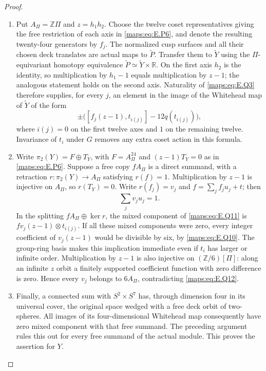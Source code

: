 \begin{proof}
\begin{enumerate}[label=\arabic*.,leftmargin=*]
\item Put $A_\Pi=\mathbb Z\Pi$ and $z=h_1h_2$.  Choose the twelve
coset representatives giving the free restriction of each
axis in \eqref{maps:eq:E.P6}, and denote the resulting twenty-four generators
by $f_j$.  The normalized cusp surfaces and all their chosen
deck translates are actual maps to $\widetilde P$.  Transfer
them to $\widetilde Y$ using the $\Pi$-equivariant homotopy
equivalence $\widetilde P\simeq\widetilde Y\times\mathbb R$.
On the first axis $h_2$ is the identity, so multiplication
by $h_1-1$ equals multiplication by $z-1$; the analogous
statement holds on the second axis.  Naturality of \eqref{maps:eq:E.Q3}
therefore supplies, for every $j$, an element in the image
of the Whitehead map of $\widetilde Y$ of the form
\[
 \pm\bigl([f_j(z-1),t_{i(j)}]-12q(t_{i(j)})\bigr),
 \tag{E.Q11}\label{maps:eq:E.Q11}
\]
where $i(j)=0$ on the first twelve axes and $1$ on the
remaining twelve.  Invariance of $t_i$ under $G$ removes
any extra coset action in this formula.

\item Write $\pi_2(Y)=F\oplus T_Y$, with $F=A_\Pi^{24}$ and
$(z-1)T_Y=0$ as in \eqref{maps:eq:E.P6}.  Suppose a free copy $fA_\Pi$
is a direct summand, with a retraction $r:\pi_2(Y)\to A_\Pi$
satisfying $r(f)=1$.  Multiplication by $z-1$ is injective
on $A_\Pi$, so $r(T_Y)=0$.  Write $r(f_j)=v_j$ and
$f=\sum_j f_j u_j+t$; then
\[
                         \sum_j v_j u_j=1.
 \tag{E.Q12}\label{maps:eq:E.Q12}
\]
In the splitting $fA_\Pi\oplus\ker r$, the mixed component
of \eqref{maps:eq:E.Q11} is $f v_j(z-1)\otimes t_{i(j)}$.  If all these
mixed components were zero, every integer coefficient of
$v_j(z-1)$ would be divisible by six, by \eqref{maps:eq:E.Q10}.  The
group-ring basis makes this implication immediate even if
$t_i$ has larger or infinite order.  Multiplication by
$z-1$ is also injective on $(\mathbb Z/6)[\Pi]$: along an
infinite $z$ orbit a finitely supported coefficient function
with zero difference is zero.  Hence every $v_j$ belongs
to $6A_\Pi$, contradicting \eqref{maps:eq:E.Q12}.

\item Finally, a connected sum with $S^2\times S^7$ has, through
dimension four in its universal cover, the original space
wedged with a free deck orbit of two-spheres.  All images
of its four-dimensional Whitehead map consequently have
zero mixed component with that free summand.  The preceding
argument rules this out for every free summand of the actual
module.  This proves the assertion for $Y$.
\end{enumerate}
\end{proof}


